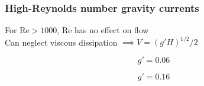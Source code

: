 \documentclass{beamer}
\begin{document}
\begin{frame}
  \frametitle{High-Reynolds number gravity currents}

  For $\text{Re} > 1000$, $\text{Re}$ has no effect on flow \\
  
  Can neglect viscous dissipation $\implies V = (g'H)^{1/2}/2$

  $$ g' = 0.06 $$

  $$ g' = 0.16 $$  
  
\end{frame}
\end{document}

